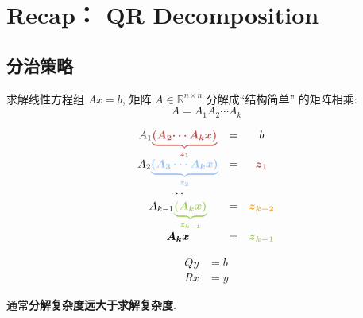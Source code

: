 \section{Recap： QR Decomposition}

\subsection{分治策略}

求解线性方程组 $ A x=b $, 矩阵 $ A \in \mathbb{R}^{n \times n} $ 分解成“结构简单” 的矩阵相乘:
$$
A=A_{1} A_{2} \cdots A_{k}
$$

\begin{example}[求解k个线性方程组 $ A_{1} A_{2} \cdots A_{k} x=b $]
    $$\displaystyle \begin{matrix}
        A_{1}\textcolor[rgb]{0.72,0.33,0.31}{\boldsymbol{\underbrace{\boldsymbol{\textcolor[rgb]{0.72,0.33,0.31}{(}\textcolor[rgb]{0.72,0.33,0.31}{A}\textcolor[rgb]{0.72,0.33,0.31}{_{2}}\textcolor[rgb]{0.72,0.33,0.31}{\cdots A}\textcolor[rgb]{0.72,0.33,0.31}{_{k}}\textcolor[rgb]{0.72,0.33,0.31}{x}\textcolor[rgb]{0.72,0.33,0.31}{)}}}_{z_{1}}}} & = & b\\
        \textcolor[rgb]{0,0,0}{A}\textcolor[rgb]{0,0,0}{_{2}}\textcolor[rgb]{0.6,0.76,0.96}{\underbrace{\boldsymbol{( A_{3} \cdots A_{k} x)}}_{\boldsymbol{z_{2}}}} & = & \boldsymbol{\textcolor[rgb]{0.72,0.33,0.31}{z}\textcolor[rgb]{0.72,0.33,0.31}{_{1}}}\\
        \cdots  &  & \\
        A_{k-1}\textcolor[rgb]{0.63,0.81,0.37}{\boldsymbol{\underbrace{(\textcolor[rgb]{0.63,0.81,0.37}{A}\textcolor[rgb]{0.63,0.81,0.37}{_{k}}\textcolor[rgb]{0.63,0.81,0.37}{x}\textcolor[rgb]{0.63,0.81,0.37}{)}}_{z_{k-1}}}} & = & \boldsymbol{\textcolor[rgb]{0.96,0.65,0.14}{z}\textcolor[rgb]{0.96,0.65,0.14}{_{k-2}}}\\
        \boldsymbol{A_{k} x} & = & \boldsymbol{\textcolor[rgb]{0.63,0.81,0.37}{z}\textcolor[rgb]{0.63,0.81,0.37}{_{k-1}}}
        \end{matrix}$$
\end{example}

\begin{example}[QR分解$Ax = b$]
    $$
\begin{aligned}
    Q y&=b\\
    R x&=y
\end{aligned}
$$
\end{example}

通常\textbf{分解复杂度远大于求解复杂度}.

